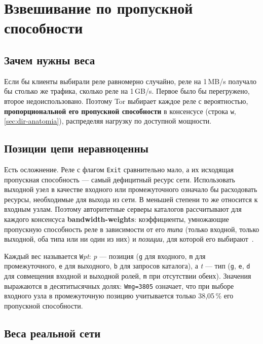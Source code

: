 \section{Взвешивание по пропускной способности}\label{sec:percorso-pesi}

\subsection{Зачем нужны веса}

Если бы клиенты выбирали реле равномерно случайно, реле на 1\,MB/s получало бы столько же трафика, сколько реле на 1\,GB/s. Первое было бы перегружено, второе недоиспользовано. Поэтому Tor выбирает каждое реле с вероятностью, \textbf{пропорциональной его пропускной способности} в консенсусе (строка \texttt{w}, \cref{sec:dir-anatomia}), распределяя нагрузку по доступной мощности.

\subsection{Позиции цепи неравноценны}

Есть осложнение. Реле с флагом \texttt{Exit} сравнительно мало, а их исходящая пропускная способность --- самый дефицитный ресурс сети. Использовать выходной узел в качестве входного или промежуточного означало бы расходовать ресурсы, необходимые для выхода из сети. В меньшей степени то же относится к входным узлам. Поэтому авторитетные серверы каталогов рассчитывают для каждого консенсуса \textbf{bandwidth-weights}: коэффициенты, умножающие пропускную способность реле в зависимости от его \emph{типа} (только входной, только выходной, оба типа или ни один из них) и \emph{позиции}, для которой его выбирают~.

Каждый вес называется \texttt{W}\emph{pt}: \emph{p} --- позиция (\texttt{g} для входного, \texttt{m} для промежуточного, \texttt{e} для выходного, \texttt{b} для запросов каталога), а \emph{t} --- тип (\texttt{g}, \texttt{e}, \texttt{d} для совмещения входной и выходной ролей, \texttt{m} при отсутствии обеих). Значения выражаются в десятитысячных долях: \texttt{Wmg=3805} означает, что при выборе входного узла в промежуточную позицию учитывается только 38,05\,\% его пропускной способности.

\subsection{Веса реальной сети}

